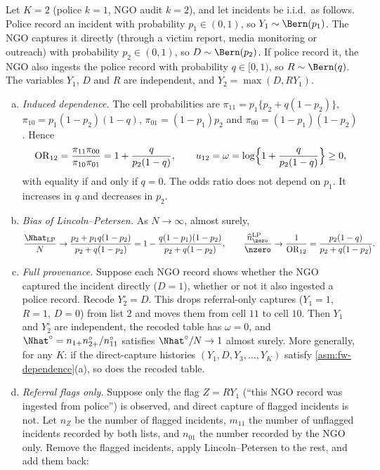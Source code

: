 \begin{proposition}\label{prop:referral}
Let $K=2$ (police $k=1$, NGO audit $k=2$), and let incidents be i.i.d.\ as follows. Police record an incident with probability $p_1\in(0,1)$, so $Y_1\sim\Bern(p_1)$. The NGO captures it directly (through a victim report, media monitoring or outreach) with probability $p_2\in(0,1)$, so $D\sim\Bern(p_2)$. If police record it, the NGO also ingests the police record with probability $q\in[0,1)$, so $R\sim\Bern(q)$. The variables $Y_1$, $D$ and $R$ are independent, and $Y_2=\max(D,RY_1)$.
\begin{enumerate}[(a)]
  \item \emph{Induced dependence.} The cell probabilities are $\pi_{11}=p_1\{p_2+q(1-p_2)\}$, $\pi_{10}=p_1(1-p_2)(1-q)$, $\pi_{01}=(1-p_1)p_2$ and $\pi_{00}=(1-p_1)(1-p_2)$. Hence
  \begin{equation}\label{eq:id-referral-or}
    \mathrm{OR}_{12}=\frac{\pi_{11}\pi_{00}}{\pi_{10}\pi_{01}}=1+\frac{q}{p_2(1-q)},
    \qquad
    u_{12}=\omega=\log\Bigl\{1+\frac{q}{p_2(1-q)}\Bigr\}\ge0,
  \end{equation}
  with equality if and only if $q=0$. The odds ratio does not depend on $p_1$. It increases in $q$ and decreases in $p_2$.
  \item \emph{Bias of Lincoln--Petersen.} As $N\to\infty$, almost surely,
  \begin{equation}\label{eq:id-referral-bias}
    \frac{\Nhat_{\mathrm{LP}}}{N}\to\frac{p_2+p_1q(1-p_2)}{p_2+q(1-p_2)}=1-\frac{q(1-p_1)(1-p_2)}{p_2+q(1-p_2)},
    \qquad
    \frac{\widehat n_{\zero}^{\mathrm{LP}}}{\nzero}\to\frac{1}{\mathrm{OR}_{12}}=\frac{p_2(1-q)}{p_2+q(1-p_2)} .
  \end{equation}
  \item \emph{Full provenance.} Suppose each NGO record shows whether the NGO captured the incident directly ($D=1$), whether or not it also ingested a police record. Recode $Y_2^\circ=D$. This drops referral-only captures ($Y_1=1$, $R=1$, $D=0$) from list $2$ and moves them from cell $11$ to cell $10$. Then $Y_1$ and $Y_2^\circ$ are independent, the recoded table has $\omega=0$, and $\Nhat^\circ=n_{1+}n^\circ_{2+}/n^\circ_{11}$ satisfies $\Nhat^\circ/N\to1$ almost surely. More generally, for any $K$: if the direct-capture histories $(Y_1,D,Y_3,\dots,Y_K)$ satisfy \cref{asm:fw-dependence}(a), so does the recoded table.
  \item \emph{Referral flags only.} Suppose only the flag $Z=RY_1$ (``this NGO record was ingested from police'') is observed, and direct capture of flagged incidents is not. Let $n_Z$ be the number of flagged incidents, $m_{11}$ the number of unflagged incidents recorded by both lists, and $n_{01}$ the number recorded by the NGO only. Remove the flagged incidents, apply Lincoln--Petersen to the rest, and add them back:

\end{enumerate}
\end{proposition}
